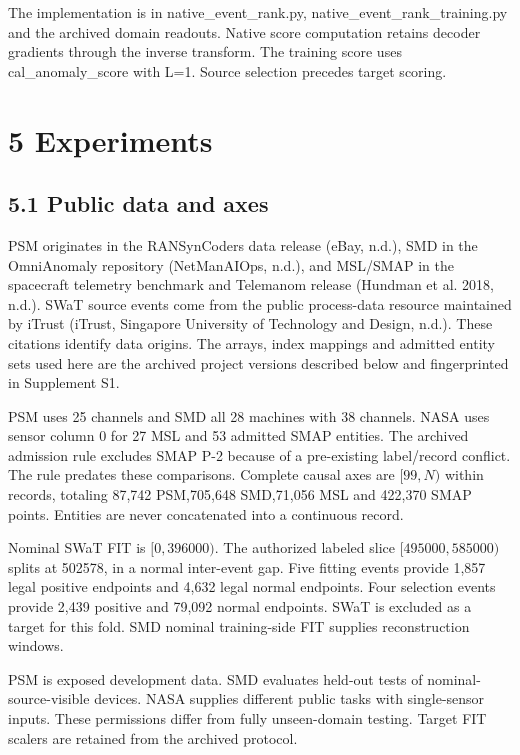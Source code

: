 \documentclass[
  english,
  10pt,
]{article}
\begin{document}
The implementation is in native\_event\_rank.py,
native\_event\_rank\_training.py and the archived domain readouts.
Native score computation retains decoder gradients through the inverse
transform. The training score uses cal\_anomaly\_score with L=1. Source
selection precedes target scoring.

\section{5 Experiments}\label{experiments}

\subsection{5.1 Public data and axes}\label{public-data-and-axes}

PSM originates in the RANSynCoders data release ({eBay}, n.d.), SMD in
the OmniAnomaly repository (NetManAIOps, n.d.), and MSL/SMAP in the
spacecraft telemetry benchmark and Telemanom release (Hundman et al.
2018, n.d.). SWaT source events come from the public process-data
resource maintained by iTrust ({iTrust, Singapore University of
Technology and Design}, n.d.). These citations identify data origins.
The arrays, index mappings and admitted entity sets used here are the
archived project versions described below and fingerprinted in
Supplement S1.

PSM uses 25 channels and SMD all 28 machines with 38 channels. NASA uses
sensor column 0 for 27 MSL and 53 admitted SMAP entities. The archived
admission rule excludes SMAP P-2 because of a pre-existing label/record
conflict. The rule predates these comparisons. Complete causal axes are
\([99,N)\) within records, totaling 87,742 PSM,705,648 SMD,71,056 MSL
and 422,370 SMAP points. Entities are never concatenated into a
continuous record.

Nominal SWaT FIT is \([0,396000)\). The authorized labeled slice
\([495000,585000)\) splits at 502578, in a normal inter-event gap. Five
fitting events provide 1,857 legal positive endpoints and 4,632 legal
normal endpoints. Four selection events provide 2,439 positive and
79,092 normal endpoints. SWaT is excluded as a target for this fold. SMD
nominal training-side FIT supplies reconstruction windows.

PSM is exposed development data. SMD evaluates held-out tests of
nominal-source-visible devices. NASA supplies different public tasks
with single-sensor inputs. These permissions differ from fully
unseen-domain testing. Target FIT scalers are retained from the archived
protocol.
\end{document}
